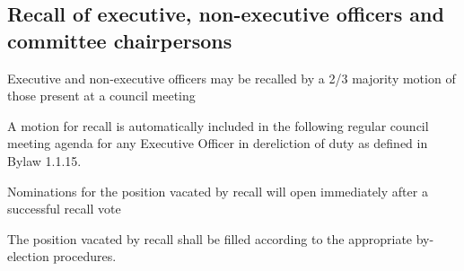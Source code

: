 \subsection {Recall of executive, non-executive officers and committee chairpersons}
\begin{longenum}[ label*=\thesubsection.\arabic*., align=left]
	\item Executive and non-executive officers may be recalled by a 2/3 majority motion of those present at a council meeting
    \item A motion for recall is automatically included in the following regular council meeting agenda for any Executive Officer in dereliction of duty as defined in Bylaw 1.1.15.
    \item Nominations for the position vacated by recall will open immediately after a successful recall vote
    \item The position vacated by recall shall be filled according to the appropriate by-election procedures.
\end{longenum}

